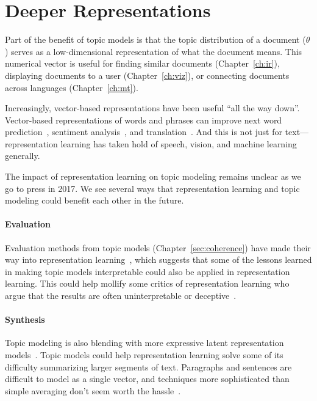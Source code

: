 \section{Deeper Representations}

Part of the benefit of topic models is that the topic distribution of
a document ($\theta$) serves as a low-dimensional representation of
what the document means.  This numerical vector is useful for finding
similar documents (Chapter~\ref{ch:ir}), displaying documents to a user
(Chapter~\ref{ch:viz}), or connecting documents across languages
(Chapter~\ref{ch:mt}).

Increasingly, vector-based representations have been useful ``all the
way down''.  Vector-based representations of words and phrases can
improve next word prediction~\citep{bengio-03}, sentiment
analysis~\citep{socher-12}, and translation~\citep{devlin-14}.  And
this is not just for text---representation learning has taken hold of
speech, vision, and machine learning generally.

The impact of representation learning on topic modeling remains
unclear as we go to press in 2017.  We see several ways that
representation learning and topic modeling could benefit each other in
the future.

\paragraph{Evaluation}

Evaluation methods from topic models (Chapter~\ref{sec:coherence})
have made their way into representation
learning~\citep{schnabel-15,iyyer-16}, which suggests that some of the
lessons learned in making topic models interpretable could also be
applied in representation learning.  This could help mollify some
critics of representation learning who argue that the results are
often uninterpretable or deceptive~\citep{szegedy-13}.

\paragraph{Synthesis}

Topic modeling is also blending with more expressive latent
representation models~\citep{ranganath-15}.  Topic models could help
representation learning solve some of its difficulty summarizing
larger segments of text.  Paragraphs and sentences are difficult to
model as a single vector, and techniques more sophisticated than
simple averaging don't seem worth the hassle~\citep{iyyer-15}.

